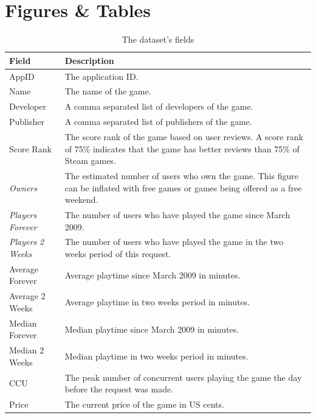 \documentclass[figures_tabs.tex]{subfiles}
\begin{document}
\section{Figures \& Tables} %
\label{sec:figures_tables}
\begin{table}[H]
    \centering
    \begin{tabularx}{\textwidth}{|l|X|}
        \hline
        Field & Description \\
        \hline
        AppID & The application ID. \\
        \hline
        Name & The name of the game. \\
        \hline
        Developer & A comma separated list of developers of the game. \\
        \hline
        Publisher & A comma separated list of publishers of the game. \\
        \hline
        Score Rank & The score rank of the game based on user reviews. A score
        rank of 75\% indicates that the game has better reviews than 75\% of
        Steam games. \\
        \hline
        \emph{Owners} & The estimated number of users who own the game. This
        figure can be inflated with free games or games being offered as a free
        weekend. \\
        \hline
        \emph{Players Forever} & The number of users who have played the game
        since March 2009. \\
        \hline
        \emph{Players 2 Weeks} & The number of users who have played the game in
        the two weeks period of this request. \\
        \hline
        Average Forever & Average playtime since March 2009 in minutes.\\
        \hline
        Average 2 Weeks & Average playtime in two weeks period in minutes. \\
        \hline
        Median Forever & Median playtime since March 2009 in minutes. \\
        \hline
        Median 2 Weeks & Median playtime in two weeks period in minutes. \\
        \hline
        CCU & The peak number of concurrent users playing the game the day
        before the request was made. \\
        \hline
        Price & The current price of the game in US cents. \\
        \hline
    \end{tabularx}
    \vspace{1ex}
    \caption{The dataset's fields}
    \label{table:fields}
\end{table}
\end{document}
